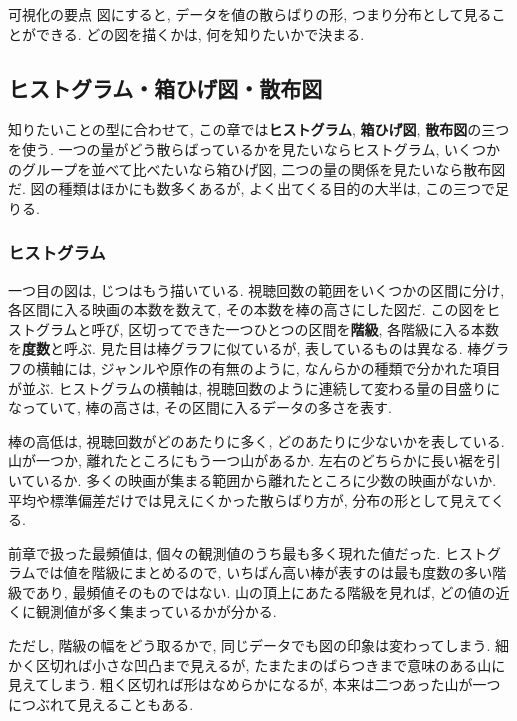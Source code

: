     \begin{mybox}{可視化の要点}
      図にすると, データを値の散らばりの形, つまり分布として見ることができる. どの図を描くかは, 何を知りたいかで決まる.
    \end{mybox}


  \subsection{ヒストグラム・箱ひげ図・散布図}

    知りたいことの型に合わせて, この章では\textbf{ヒストグラム}, \textbf{箱ひげ図}, \textbf{散布図}の三つを使う.
    一つの量がどう散らばっているかを見たいならヒストグラム, いくつかのグループを並べて比べたいなら箱ひげ図, 二つの量の関係を見たいなら散布図だ.
    図の種類はほかにも数多くあるが, よく出てくる目的の大半は, この三つで足りる.

    \subsubsection*{ヒストグラム}

      一つ目の図は, じつはもう描いている.
      視聴回数の範囲をいくつかの区間に分け, 各区間に入る映画の本数を数えて, その本数を棒の高さにした図だ.
      この図をヒストグラムと呼び, 区切ってできた一つひとつの区間を\textbf{階級}, 各階級に入る本数を\textbf{度数}と呼ぶ.
      見た目は棒グラフに似ているが, 表しているものは異なる.
      棒グラフの横軸には, ジャンルや原作の有無のように, なんらかの種類で分かれた項目が並ぶ.
      ヒストグラムの横軸は, 視聴回数のように連続して変わる量の目盛りになっていて, 棒の高さは, その区間に入るデータの多さを表す.

      棒の高低は, 視聴回数がどのあたりに多く, どのあたりに少ないかを表している.
      山が一つか, 離れたところにもう一つ山があるか.
      左右のどちらかに長い裾を引いているか.
      多くの映画が集まる範囲から離れたところに少数の映画がないか.
      平均や標準偏差だけでは見えにくかった散らばり方が, 分布の形として見えてくる.

      前章で扱った最頻値は, 個々の観測値のうち最も多く現れた値だった.
      ヒストグラムでは値を階級にまとめるので, いちばん高い棒が表すのは最も度数の多い階級であり, 最頻値そのものではない.
      山の頂上にあたる階級を見れば, どの値の近くに観測値が多く集まっているかが分かる.

      ただし, 階級の幅をどう取るかで, 同じデータでも図の印象は変わってしまう.
      細かく区切れば小さな凹凸まで見えるが, たまたまのばらつきまで意味のある山に見えてしまう.
      粗く区切れば形はなめらかになるが, 本来は二つあった山が一つにつぶれて見えることもある.

